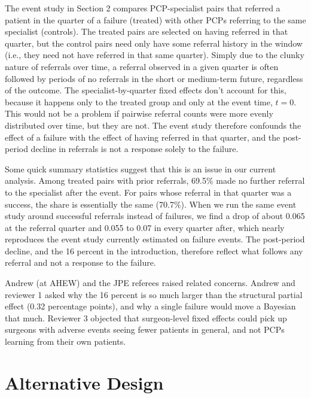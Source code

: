 \documentclass[12pt]{article}
\begin{document}
The event study in Section 2 compares PCP-specialist pairs that referred a patient in the quarter of a failure (treated) with other PCPs referring to the same specialist (controls). The treated pairs are selected on having referred in that quarter, but the control pairs need only have some referral history in the window (i.e., they need not have referred in that same quarter). Simply due to the clunky nature of referrals over time, a referral observed in a given quarter is often followed by periods of no referrals in the short or medium-term future, regardless of the outcome. The specialist-by-quarter fixed effects don't account for this, because it happens only to the treated group and only at the event time, $t=0$. This would not be a problem if pairwise referral counts were more evenly distributed over time, but they are not. The event study therefore confounds the effect of a failure with the effect of having referred in that quarter, and the post-period decline in referrals is not a response solely to the failure.

Some quick summary statistics suggest that this is an issue in our current analysis. Among treated pairs with prior referrals, 69.5\% made no further referral to the specialist after the event. For pairs whose referral in that quarter was a success, the share is essentially the same (70.7\%). When we run the same event study around successful referrals instead of failures, we find a drop of about 0.065 at the referral quarter and 0.055 to 0.07 in every quarter after, which nearly reproduces the event study currently estimated on failure events. The post-period decline, and the 16 percent in the introduction, therefore reflect what follows any referral and not a response to the failure.

Andrew (at AHEW) and the JPE referees raised related concerns. Andrew and reviewer 1 asked why the 16 percent is so much larger than the structural partial effect (0.32 percentage points), and why a single failure would move a Bayesian that much. Reviewer 3 objected that surgeon-level fixed effects could pick up surgeons with adverse events seeing fewer patients in general, and not PCPs learning from their own patients.

\section*{Alternative Design}
\end{document}
